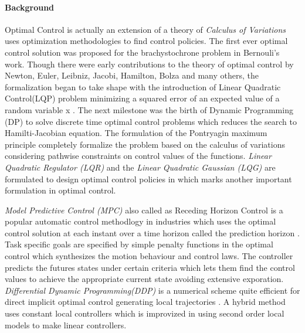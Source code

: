 \paragraph{Background}
Optimal Control is actually an extension of a theory of \textit{Calculus of Variations} uses optimization methodologies to find control policies. The first ever optimal control solution was proposed for the brachystochrone problem in Bernouli's work. Though there were early contributions to the theory of optimal control by Newton, Euler, Leibniz, Jacobi, Hamilton, Bolza and many others, the formalization began to take shape with the introduction of Linear Quadratic Control(LQP) problem minimizing a squared error of an expected value of a random variable x \cite{wiener1949extrapolation}. The next milestone was the birth of Dynamic Programming (DP) to solve discrete time optimal control problems which reduces the search to Hamilti-Jacobian equation. The formulation of the Pontryagin maximum principle \cite{pontryagin1987mathematical} completely formalize the problem based on the calculus of variations considering  pathwise constraints on control values of the functions. \textit{Linear Quadratic Regulator (LQR)} and the \textit{Linear Quadratic Gaussian (LQG)} are formulated to design optimal control policies in \cite{Kalman1960} which marks another important formulation in optimal control.

\textit{Model Predictive Control (MPC)} also called as Receding Horizon Control is a popular automatic control methodlogy in industries which uses the optimal control solution at each instant over a time horizon called the prediction horizon \cite{richalet1978model}. Task specific goals are specified by simple penalty functions in the optimal control which synthesizes the motion behaviour and control laws. The controller predicts the futures states under certain criteria which lets them find the control values to achieve the appropriate current state avoiding extensive exporation. \textit{Differential Dynamic Programming(DDP)} is a numerical scheme quite efficient for direct implicit optimal control generating local trajectories \cite{jacobson1968new}. A hybrid method uses constant local controllers \cite{atkeson1994using} which is improvized in \cite{atkeson2003nonparametric} using second order local models to make linear controllers.


